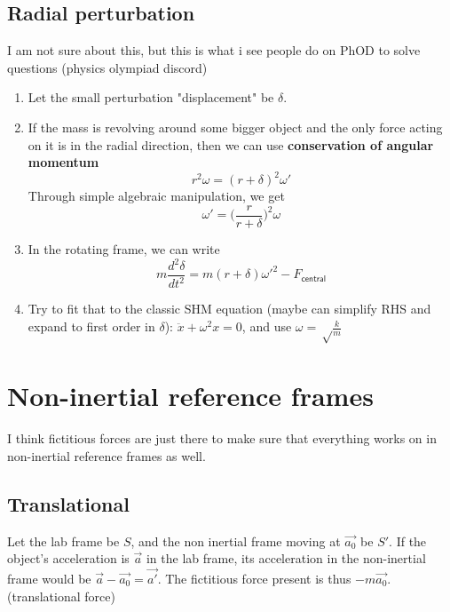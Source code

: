 \subsection{Radial perturbation}
I am not sure about this, but this is what i see people do on PhOD to solve questions (physics olympiad discord)
\begin{enumerate}
    \item Let the small perturbation "displacement" be $\delta$.
    \item If the mass is revolving around some bigger object and the only force acting on it is in the radial direction, then we can use \textbf{conservation of angular momentum}
          \begin{equation}
              r^2\omega=(r+\delta)^2\omega'
          \end{equation}
          Through simple algebraic manipulation, we get
          \begin{equation}
              \omega'= \bigg(\frac{r}{r+\delta}\bigg)^2\omega
          \end{equation}
    \item In the rotating frame, we can write
          \begin{equation}
              m \frac{d^2 \delta}{dt^2}= m (r+\delta)\omega'^2-F_{\textsf{central}}
          \end{equation}
    \item Try to fit that to the classic SHM equation (maybe can simplify RHS and expand to first order in $\delta$): $\ddot{x}+\omega^2 x = 0$, and use $\omega = \sqrt \frac{k}{m}$
\end{enumerate}

\section{Non-inertial reference frames}
I think fictitious forces are just there to make sure that everything works on in non-inertial reference frames as well.
\subsection{Translational}
Let the lab frame be $S$, and the non inertial frame moving at $\vec{a_0}$ be $S'$. If the object's acceleration is $\vec{a}$ in the lab frame, its acceleration in the non-inertial frame would be $\vec{a}-\vec{a_0}=\vec{a'}$. The fictitious force present is thus $-m \vec{a_0}$. (translational force)

